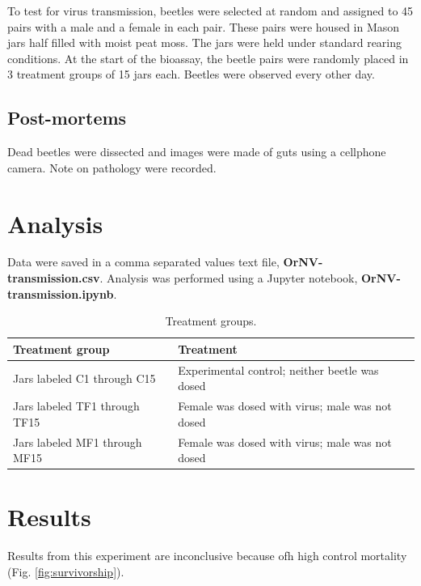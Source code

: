 \documentclass[11pt,letterpaper]{scrartcl}
\begin{document}
To test for virus transmission, beetles were selected at random and assigned to 45 pairs with a male and a female 
in each pair. These pairs were housed in Mason jars half filled with moist peat moss. The jars were held under 
standard rearing conditions. At the start of the bioassay, the beetle pairs were randomly placed in 3 treatment groups of 15 jars each. Beetles were observed every other day.

\subsection{Post-mortems}

Dead beetles were dissected and images were made of guts using a cellphone camera. Note on pathology were recorded.


\section{Analysis}

Data were saved in a comma separated values text file, \textbf{OrNV-transmission.csv}. Analysis was performed using a Jupyter notebook, \textbf{OrNV-transmission.ipynb}.

\begin{table}[h]
	\centering
\caption{Treatment groups.}
	
\begin{tabular}{ll}
	\toprule
	Treatment group & Treatment\\
	\midrule
	Jars labeled C1 through C15 & Experimental control; neither beetle was dosed\\
    Jars labeled TF1 through TF15 & Female was dosed with virus; male was not dosed\\
    Jars labeled MF1 through MF15 & Female was dosed with virus; male was not dosed\\
	\bottomrule
\end{tabular} 

\end{table}

\section{Results}

Results from this experiment are inconclusive because ofh high control mortality (Fig. \ref{fig:survivorship}).
\end{document}
